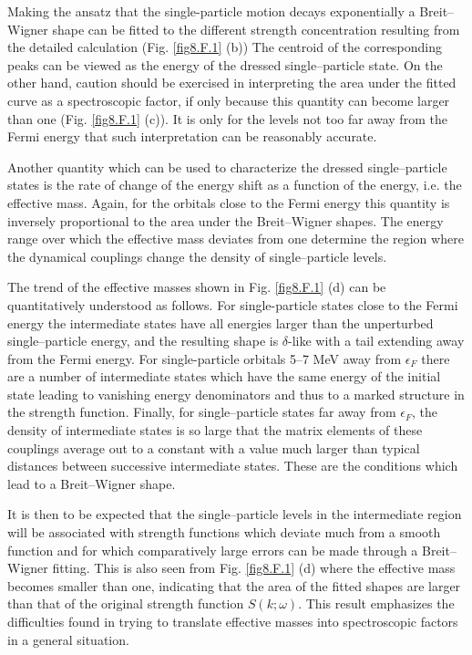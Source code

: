 \begin{subappendices}
Making the ansatz that the single-particle motion decays exponentially a Breit--Wigner shape can be fitted to the different strength concentration resulting from the detailed calculation (Fig. \ref{fig8.F.1} (b)) The centroid of the corresponding peaks can be viewed as the energy of the dressed single--particle state. On the other hand, caution should be exercised in interpreting the area under the fitted curve as a spectroscopic factor, if only because this quantity can become larger than one (Fig. \ref{fig8.F.1} (c)). It is only for the levels not too far away from the Fermi energy that such interpretation can   be reasonably accurate.


Another quantity which can be used to characterize the dressed single--particle states is the rate of change of the energy shift as a function of the energy, i.e. the effective mass. Again, for the orbitals close to the Fermi energy this quantity is inversely proportional to the area under the Breit--Wigner shapes. The energy range over which the effective mass deviates from one determine the region where the dynamical couplings change the density of single--particle levels.



The trend of the effective masses shown in Fig. \ref{fig8.F.1} (d) can be quantitatively understood as follows. For single-particle states close to the Fermi energy the intermediate states have all energies larger than the unperturbed single--particle energy, and the resulting shape is $\delta$-like with a tail extending away from the Fermi energy. For single-particle orbitals 5--7 MeV away from $\epsilon_F$ there are a number of intermediate states which have the same energy of the initial state leading to vanishing energy denominators and thus to a marked structure in the strength function. Finally, for single--particle states far away from $\epsilon_F$, the density of intermediate states is so large that the matrix elements of these couplings average out to a constant with a value much larger than typical distances between successive intermediate states. These are the conditions which lead to a Breit--Wigner shape.  


It is then to be expected that the single--particle levels in the intermediate region will be associated with strength functions which deviate much from a smooth function and for which comparatively large errors can be made through a Breit--Wigner fitting. This is also seen from Fig. \ref{fig8.F.1} (d) where the effective mass becomes smaller than one, indicating that the area of the fitted shapes are larger than that of the original strength function $S(k;\omega)$. This result emphasizes the difficulties found in trying to translate effective masses into spectroscopic factors in a general situation.



\end{subappendices}
